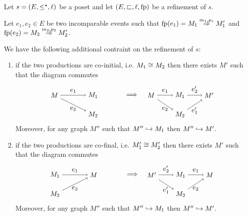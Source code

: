 \begin{lemma}
  \label{lem:rewrite_concurrent}
  Let $s=(E,\leq^{\star},\ell)$ be a poset and
  let $(E,\sqsubset,\ell,\operatorname{fp})$ be a refinement of $s$.

  Let $e_1,e_2\in E$ be two incomparable events such that
  $\operatorname{fp}(e_1) = M_1\overset{m_1,p_1}{\Rightarrow} M_1'$ and $\operatorname{fp}(e_2) = M_2\overset{m_2,p_2}{\Rightarrow} M_2'$.

  We have the following additional contraint on the refinement of $s$:
  \begin{enumerate}
  \item if the two productions are co-initial, i.e. $M_1\cong M_2$ then there exists $M'$ such that the diagram commutes
  \[
  \begin{tikzpicture} %
    \node (m2) at (0,0) {\(M_2\)};
    \node (m1) at (0,1) {\(M_1\)};
    \node (m) at (-2,1) {\(M\)};
    \node (implies) at (2,1) {\(\implies\)};
    \node (mm2) at (4.5,0) {\(M_2\)};
    \node (mm1) at (4.5,1) {\(M_1\)};
    \node (n) at (6,1) {\(M'\)};
    \node (mm) at (3,1) {\(M\)};
    \draw [->] (m) -- node [left,above] {\(e_1\)} (m1);
    \draw [->] (m) -- node [left,below] {\(e_2\)} (m2);
    \draw [->] (mm) -- node [left,above] {\(e_1\)} (mm1);
    \draw [->] (mm) -- node [left,below] {\(e_2\)} (mm2);
    \draw [->] (mm1) -- node [left,above] {\(e_2'\)} (n);
    \draw [->] (mm2) -- node [left,below] {\(e_1'\)} (n);
  \end{tikzpicture}
  \]
  Moreover, for any graph $M''$ such that $M''\hookrightarrow M_1$ then $M''\hookrightarrow M'$.
  \item if the two productions are co-final, i.e. $M_1'\cong M_2'$ then there exists $M'$ such that the diagram commutes
  \[
  \begin{tikzpicture} %
    \node (m2) at (-2,0) {\(M_2\)};
    \node (m1) at (-2,1) {\(M_1\)};
    \node (m) at (0,1) {\(M\)};
    \node (implies) at (2,1) {\(\implies\)};
    \node (mm2) at (4.5,0) {\(M_2\)};
    \node (mm1) at (4.5,1) {\(M_1\)};
    \node (n) at (3,1) {\(M'\)};
    \node (mm) at (6,1) {\(M\)};
    \draw [->] (m1) -- node [left,above] {\(e_1\)} (m);
    \draw [->] (m2) -- node [left,below] {\(e_2\)} (m);
    \draw [->] (mm1) -- node [left,above] {\(e_1\)} (mm);
    \draw [->] (mm2) -- node [left,below] {\(e_2\)} (mm);
    \draw [->] (n) -- node [left,above] {\(e_2'\)} (mm1);
    \draw [->] (n) -- node [left,below] {\(e_1'\)} (mm2);
  \end{tikzpicture}
  \]
  Moreover, for any graph $M''$ such that $M''\hookrightarrow M_1$ then $M''\hookrightarrow M'$.
  \end{enumerate}
\end{lemma}

